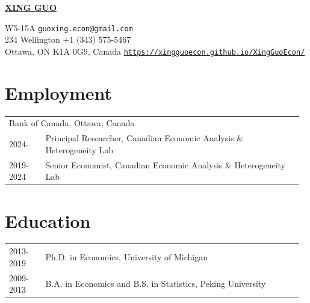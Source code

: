 \documentclass[11pt]{article}
\begin{document}
\pagestyle{empty}
{\huge \uline{\hfill\textbf{\centering XING GUO}\hfill} }\\
\begin{center}
W5-15A  \hfill\texttt{guoxing.econ@gmail.com}\\
234 Wellington \hfill +1 (343) 575-5467 \\
Ottawa, ON K1A 0G9, Canada \hfill \href{https://xingguoecon.github.io/XingGuoEcon/}{\texttt{https://xingguoecon.github.io/XingGuoEcon/}}\\

\end{center}

\section{Employment}

\begin{tabular}{p{0.12\linewidth} p{0.85\linewidth}}
	\multicolumn{2}{l}{Bank of Canada, Ottawa, Canada}\\[0.5em]
	2024- & Principal Researcher, Canadian Economic Analysis \& Heterogeneity Lab\\
	2019-2024 & Senior Economist, Canadian Economic Analysis \& Heterogeneity Lab\\
\end{tabular}



\section{Education}
\begin{tabular}{p{0.12\linewidth} p{0.85\linewidth}}
	2013-2019 & Ph.D. in Economics, University of Michigan\\
	2009-2013 & B.A. in Economics and B.S. in Statistics, Peking University\\
\end{tabular}


\end{document}
